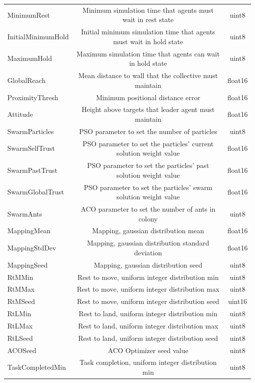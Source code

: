 \documentclass{report}
\begin{document}
\begin{appendices}
\begin{table}
\begin{center}
\begin{tabular}{|l|c|c|}
			MinimumRest & Minimum simulation time that agents must wait in rest state & uint8 \\
			InitialMinimumHold & Initial minimum simulation time that agents must wait in hold state & uint8 \\
			MaximumHold  & Maximum simulation time that agents can wait in hold state & uint8 \\
			GlobalReach & Mean distance to wall that the collective must maintain & float16 \\
			ProximityThresh & Minimum positional distance error & float16 \\
			Attitude & Height above targets that leader agent must maintain & float16 \\
			SwarmParticles & PSO parameter to set the number of particles & uint8 \\
			SwarmSelfTrust & PSO parameter to set the particles' current solution weight value & float16 \\
			SwarmPastTrust & PSO parameter to set the particles' past solution weight value & float16 \\
			SwarmGlobalTrust & PSO parameter to set the particles' swarm solution weight value & float16 \\
			SwarmAnts & ACO parameter to set the number of ants in colony & uint8 \\
			MappingMean & Mapping, gaussian distribution mean & float16 \\
			MappingStdDev & Mapping, gaussian distribution standard deviation & float16 \\
			MappingSeed & Mapping, gaussian distribution seed & uint8 \\
			RtMMin & Rest to move, uniform integer distribution min & uint8 \\
			RtMMax & Rest to move, uniform integer distribution max & uint8 \\
			RtMSeed & Rest to move, uniform integer distribution seed & uint16 \\
			RtLMin & Rest to land, uniform integer distribution min & uint8 \\
			RtLMax & Rest to land, uniform integer distribution max & uint8 \\
			RtLSeed & Rest to land, uniform integer distribution seed & uint8 \\
			ACOSeed & ACO Optimizer seed value & uint8 \\
			TaskCompletedMin & Task completion, uniform integer distribution min & uint8 \\

\end{tabular}
\end{center}
\end{table}
\end{appendices}
\end{document}
